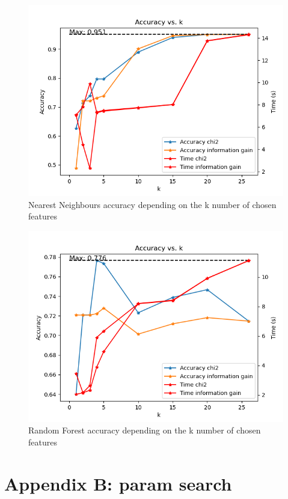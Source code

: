\documentclass{article}
\begin{document}
\begin{figure}
    \centering
    \includegraphics{report_img/k_search/nearest_neighbors}
    \caption{Nearest Neighbours accuracy depending on the k number of chosen features}
    \label{fig:}
\end{figure}

\begin{figure}
    \centering
    \includegraphics{report_img/k_search/random_forest}
    \caption{Random Forest accuracy depending on the k number of chosen features}
    \label{fig:}
\end{figure}

    \section{Appendix B: param search}
\end{document}
